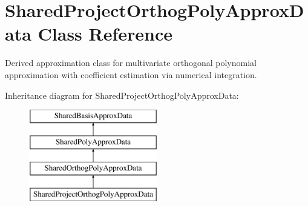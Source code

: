 \section{Shared\+Project\+Orthog\+Poly\+Approx\+Data Class Reference}
\label{classPecos_1_1SharedProjectOrthogPolyApproxData}


Derived approximation class for multivariate orthogonal polynomial approximation with coefficient estimation via numerical integration.  


Inheritance diagram for Shared\+Project\+Orthog\+Poly\+Approx\+Data\+:\begin{figure}[H]
\begin{center}
\leavevmode
\includegraphics[height=4.000000cm]{classPecos_1_1SharedProjectOrthogPolyApproxData}
\end{center}
\end{figure}
